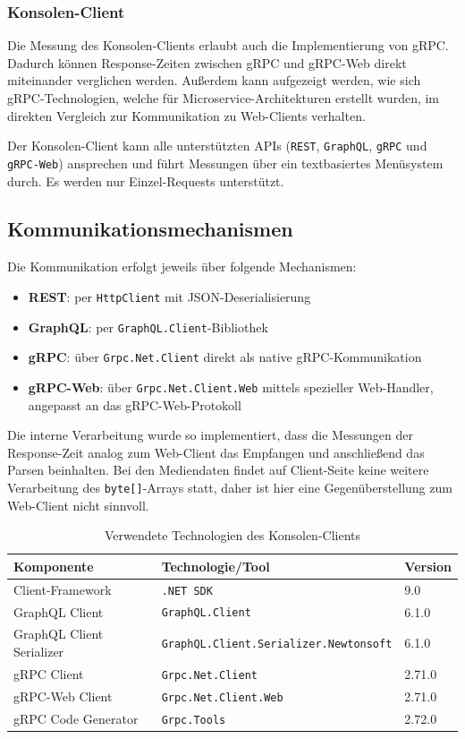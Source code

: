 \begin{enumerate}
\subsubsection{Konsolen-Client}
Die Messung des Konsolen-Clients erlaubt auch die Implementierung von gRPC. Dadurch können Response-Zeiten zwischen gRPC und gRPC-Web direkt miteinander verglichen werden. Außerdem kann aufgezeigt werden, wie sich gRPC-Technologien, welche für Microservice-Architekturen erstellt wurden, im direkten Vergleich zur Kommunikation zu Web-Clients verhalten. 

Der Konsolen-Client kann alle unterstützten APIs (\texttt{REST}, \texttt{GraphQL}, \texttt{gRPC} und \texttt{gRPC-Web}) ansprechen und führt Messungen über ein textbasiertes Menüsystem durch.  
Es werden nur Einzel-Requests unterstützt.

\subsection*{Kommunikationsmechanismen}
Die Kommunikation erfolgt jeweils über folgende Mechanismen:
\begin{itemize}
	\item \textbf{REST}: per \texttt{HttpClient} mit JSON-Deserialisierung
	\item \textbf{GraphQL}: per \texttt{GraphQL.Client}-Bibliothek
	\item \textbf{gRPC}: über \texttt{Grpc.Net.Client} direkt als native gRPC-Kommunikation
	\item \textbf{gRPC-Web}: über \texttt{Grpc.Net.Client.Web} mittels spezieller Web-Handler, angepasst an das gRPC-Web-Protokoll
\end{itemize}

Die interne Verarbeitung wurde so implementiert, dass die Messungen der Response-Zeit analog zum Web-Client das Empfangen und anschließend das Parsen beinhalten.  
Bei den Mediendaten findet auf Client-Seite keine weitere Verarbeitung des \texttt{byte[]}-Arrays statt, daher ist hier eine Gegenüberstellung zum Web-Client nicht sinnvoll.

\begin{table}[h]
	\centering
	\caption{Verwendete Technologien des Konsolen-Clients}
	\begin{tabular}{lll}
		\hline
		\textbf{Komponente} & \textbf{Technologie/Tool} & \textbf{Version} \\
		\hline
		Client-Framework & \texttt{.NET~SDK} & 9.0 \\
		GraphQL Client & \texttt{GraphQL.Client} & 6.1.0 \\
		GraphQL Client Serializer & \texttt{GraphQL.Client.Serializer.Newtonsoft} & 6.1.0 \\
		gRPC Client & \texttt{Grpc.Net.Client} & 2.71.0 \\
		gRPC-Web Client & \texttt{Grpc.Net.Client.Web} & 2.71.0 \\
		gRPC Code Generator & \texttt{Grpc.Tools} & 2.72.0 \\
		\hline
	\end{tabular}
\end{table}
	
\end{enumerate}

